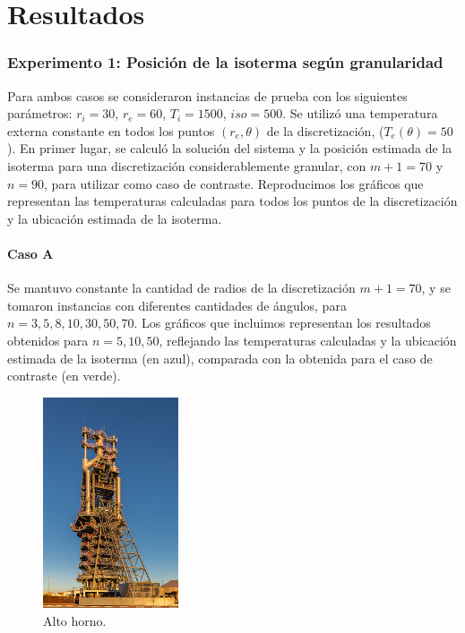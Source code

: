 \section{Resultados}

  \subsubsection*{Experimento 1: Posición de la isoterma según granularidad}

    Para ambos casos se consideraron instancias de prueba con los siguientes parámetros: $r_i = 30$, $r_e = 60$, $T_i = 1500$, $iso = 500$. Se utilizó una temperatura externa constante en todos los puntos $(r_e, \theta)$ de la discretización, ($T_e(\theta) = 50$).
    En primer lugar, se calculó la solución del sistema y la posición estimada de la isoterma para una discretización considerablemente granular, con $m + 1 = 70$ y $n = 90$, para utilizar como caso de contraste. Reproducimos los gráficos que representan las temperaturas calculadas para todos los puntos de la discretización y la ubicación estimada de la isoterma.

    \paragraph{Caso A} Se mantuvo constante la cantidad de radios de la discretización $m + 1 = 70$, y se tomaron instancias con diferentes cantidades de ángulos, para $n = 3, 5, 8, 10, 30, 50, 70$. Los gráficos que incluimos representan los resultados obtenidos para $n = 5, 10, 50$, reflejando las temperaturas calculadas y la ubicación estimada de la isoterma (en azul), comparada con la obtenida para el caso de contraste (en verde).

      \begin{figure}[h]
        \centering
        \includegraphics[width=4cm]{altoHorno.jpg}
        \caption*{Alto horno.}
      \end{figure}

